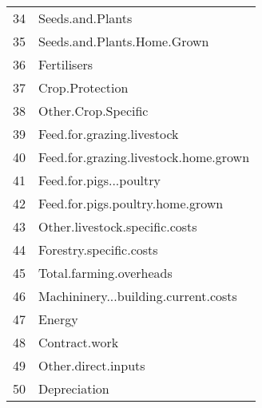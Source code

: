 \documentclass{article}\usepackage{graphicx, color}
\begin{document}
\begin{flushleft}
\begin{table}[ht]
\begin{center}
\begin{tabular}{rl}
  34 & Seeds.and.Plants \\ 
  35 & Seeds.and.Plants.Home.Grown \\ 
  36 & Fertilisers \\ 
  37 & Crop.Protection \\ 
  38 & Other.Crop.Specific \\ 
  39 & Feed.for.grazing.livestock \\ 
  40 & Feed.for.grazing.livestock.home.grown \\ 
  41 & Feed.for.pigs...poultry \\ 
  42 & Feed.for.pigs.poultry.home.grown \\ 
  43 & Other.livestock.specific.costs \\ 
  44 & Forestry.specific.costs \\ 
  45 & Total.farming.overheads \\ 
  46 & Machininery...building.current.costs \\ 
  47 & Energy \\ 
  48 & Contract.work \\ 
  49 & Other.direct.inputs \\ 
  50 & Depreciation \\ 
   \hline
\end{tabular}
\end{center}
\end{table}



\end{flushleft}
\end{document}
